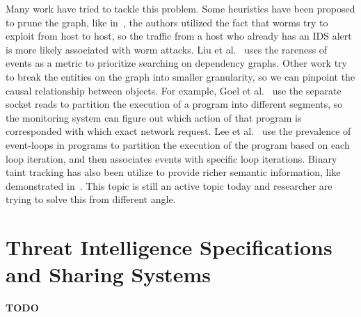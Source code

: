 Many work have tried to tackle this problem. Some heuristics have been 
proposed to prune the graph, like in~\cite{king2005enriching}, the 
authors utilized the fact that worms try to exploit from host to host,
so the traffic from a host who already has an IDS alert is more likely
associated with worm attacks. Liu et al.~\cite{liu2018towards} uses
the rareness of events as a metric to prioritize searching on dependency
graphs. Other work try to break the entities on the graph into smaller 
granularity, so we can pinpoint the causal relationship between objects.
For example, Goel et al.~\cite{goel2005taser} use the separate socket
reads to partition the execution of a program into different segments, 
so the monitoring system can figure out which action of that program
is corresponded with which exact network request. Lee et 
al.~\cite{lee2013high} use the prevalence of event-loops in programs to
partition the execution of the program based on each loop iteration,
and then associates events with specific loop iterations. Binary taint
tracking has also been utilize to provide richer semantic information, 
like demonstrated in~\cite{ma2016protracer}. This topic is still an 
active topic today and researcher are trying to solve this from different
angle.

\section{Threat Intelligence Specifications and Sharing Systems}
\textbf{TODO}


